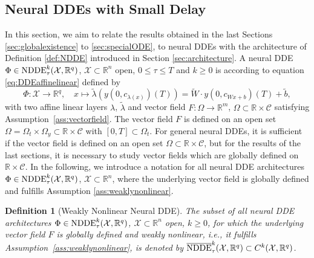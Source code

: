 \documentclass[10pt]{article}
\numberwithin{equation}{section}
\newtheorem{definition}[theorem]{Definition}
\begin{document}
	
	
	\subsection{Neural DDEs with Small Delay}
	\label{sec:NDDEsmalldelay}
	
	In this section, we aim to relate the results obtained in the last Sections \ref{sec:globalexistence} to \ref{sec:specialODE},  to neural DDEs with the architecture of Definition \ref{def:NDDE} introduced in Section \ref{sec:architecture}. A neural DDE $\Phi \in\textup{NDDE}_\tau^k(\mathcal{X},\mathbb{R}^q)$, $\mathcal{X}\subset \mathbb{R}^n$ open, $0 \leq \tau\leq T$ and $k \geq 0$ is according to equation \eqref{eq:DDEaffinelinear} defined by
	\begin{equation} \label{eq:DDEaffinelinear2}
		\Phi: \mathcal{X} \rightarrow \mathbb{R}^q, \quad x \mapsto \tilde{\lambda}(y(0,c_{\lambda(x)})(T)) = \widetilde{W} \cdot y(0,c_{Wx+b})(T) + \tilde{b} ,
	\end{equation}
	with two affine linear layers $\lambda$, $\tilde{\lambda}$ and vector field $F: \Omega\rightarrow \mathbb{R}^m$, $\Omega \subset \mathbb{R} \times \mathcal{C}$ satisfying Assumption~\ref{ass:vectorfield}. The vector field $F$ is defined on an open set $\Omega = \Omega_t \times \Omega_y \subset \mathbb{R}\times \mathcal{C}$ with $[0,T]\subset \Omega_t$. For general neural DDEs, it is sufficient if the vector field is defined on an open set  $\Omega \subset \mathbb{R} \times \mathcal{C}$, but for the results of the last sections, it is necessary to study vector fields which are globally defined on $\mathbb{R}\times \mathcal{C}$. In the following, we introduce a notation for all neural DDE architectures $\Phi \in\textup{NDDE}_\tau^k(\mathcal{X},\mathbb{R}^q)$, $\mathcal{X}\subset \mathbb{R}^n$, where the underlying vector field is globally defined and fulfills Assumption \ref{ass:weaklynonlinear}.
	
	\begin{definition}[Weakly Nonlinear Neural DDE] \label{def:NDDEglobal}
		The subset of all neural DDE architectures $\Phi \in \textup{NDDE}_\tau^k(\mathcal{X},\mathbb{R}^q)$, $\mathcal{X}\subset \mathbb{R}^n$ open, $k \geq 0$, for which the underlying vector field $F$ is globally defined and weakly nonlinear, i.e., it fulfills Assumption~\ref{ass:weaklynonlinear}, is denoted by $\overline{\textup{NDDE}}^k_\tau(\mathcal{X},\mathbb{R}^q) \subset C^k(\mathcal{X},\mathbb{R}^q)$. 
	\end{definition}
	
\end{document}
